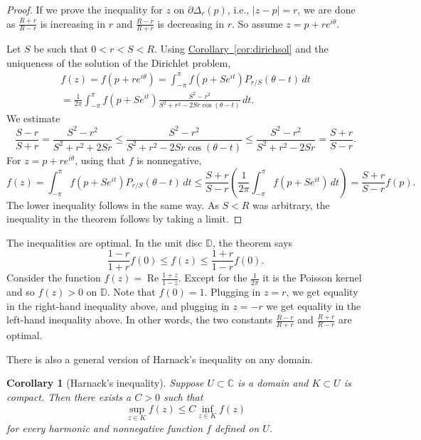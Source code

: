 \documentclass[12pt,openany]{book}
\renewcommand{\Re}{\operatorname{Re}}
\newcommand{\sabs}[1]{\lvert {#1} \rvert}
\newcommand{\C}{{\mathbb{C}}}
\newcommand{\D}{{\mathbb{D}}}
\theoremstyle{plain}
\newtheorem{cor}[thm]{Corollary}
\theoremstyle{remark}
\theoremstyle{definition}
\theoremstyle{exercise}
\theoremstyle{example}
\newcommand{\corref}[1]{\hyperref[#1]{Corollary~\ref*{#1}}}
\begin{document}
\begin{proof}
If we prove the inequality for $z$ on 
$\partial \Delta_r(p)$, i.e., $\sabs{z-p}=r$, we are done
as $\frac{R+r}{R-r}$ is increasing in $r$ and
$\frac{R-r}{R+r}$ is decreasing in $r$.  So 
assume $z = p+re^{i\theta}$.

Let $S$ be such that $0 < r < S < R$.
Using \corref{cor:dirichsol} and the uniqueness of the
solution of the
Dirichlet problem,
\begin{multline*}
f(z)
=
f(p + re^{i\theta})
=
\int_{-\pi}^\pi f(p+Se^{it}) P_{r/S}(\theta-t) \, dt
\\
=
\frac{1}{2\pi} 
\int_{-\pi}^\pi f(p+Se^{it})
\frac{S^2-r^2}{S^2+r^2-2Sr \cos (\theta-t)}
\, dt .
\end{multline*}
We estimate
\begin{equation*}
\frac{S-r}{S+r}
=
\frac{S^2-r^2}{S^2+r^2+2Sr}
\leq
\frac{S^2-r^2}{S^2+r^2-2Sr \cos (\theta-t)}
\leq
\frac{S^2-r^2}{S^2+r^2-2Sr}
=
\frac{S+r}{S-r} .
\end{equation*}
For $z = p+re^{i\theta}$,
using that $f$ is nonnegative,
\begin{equation*}
f(z)
=
\int_{-\pi}^\pi f(p+Se^{it}) P_{r/S}(\theta-t) \, dt
\leq
\frac{S+r}{S-r} 
\left(
\frac{1}{2\pi}
\int_{-\pi}^\pi f(p+Se^{it}) \, dt
\right)
=
\frac{S+r}{S-r} 
f(p) .
\end{equation*}
The lower inequality follows in the same way.
As $S<R$ was arbitrary, the inequality in the theorem 
follows by taking a limit.
\end{proof}

The inequalities are optimal.  In the unit disc $\D$, the theorem says
\begin{equation*}
\frac{1-r}{1+r} f(0) \leq f(z) \leq \frac{1+r}{1-r} f(0) .
\end{equation*}
Consider the function $f(z) = \Re \frac{1+z}{1-z}$.  Except for the
$\frac{1}{2\pi}$ it is the Poisson kernel and so 
$f(z) > 0$ on $\D$.  Note that $f(0)=1$.  Plugging in $z=r$, we get
equality in the right-hand inequality above, and plugging in $z=-r$
we get equality in the left-hand inequality above.  In other words,
the two constants
$\frac{R-r}{R+r}$ and $\frac{R+r}{R-r}$ are optimal.

There is also a general version of Harnack's inequality on any domain.

\begin{cor}[Harnack's inequality]
Suppose $U \subset \C$ is a domain and $K \subset U$ is compact.
Then there exists a $C > 0$ such that
\begin{equation*}
\sup_{z \in K} f(z) \leq C \inf_{z\in K} f(z)
\end{equation*}
for every harmonic and nonnegative function $f$ defined on $U$.
\end{cor}
\end{document}
